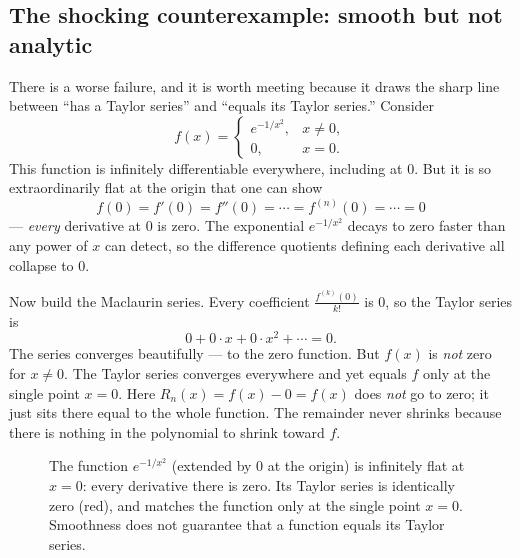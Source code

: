 \subsection{The shocking counterexample: smooth but not analytic}

There is a worse failure, and it is worth meeting because it draws the sharp line
between ``has a Taylor series'' and ``equals its Taylor series.'' Consider
\[
  f(x) =
  \begin{cases}
    e^{-1/x^2}, & x \ne 0, \\
    0, & x = 0.
  \end{cases}
\]
This function is infinitely differentiable everywhere, including at $0$. But it is so
extraordinarily flat at the origin that one can show
\[
  f(0) = f'(0) = f''(0) = \cdots = f^{(n)}(0) = \cdots = 0
\]
--- \emph{every} derivative at $0$ is zero. The exponential $e^{-1/x^2}$ decays to
zero faster than any power of $x$ can detect, so the difference quotients defining
each derivative all collapse to $0$.

Now build the Maclaurin series. Every coefficient $\frac{f^{(k)}(0)}{k!}$ is $0$, so
the Taylor series is
\[
  0 + 0\cdot x + 0\cdot x^2 + \cdots = 0.
\]
The series converges beautifully --- to the zero function. But $f(x)$ is \emph{not}
zero for $x \ne 0$. The Taylor series converges everywhere and yet equals $f$ only at
the single point $x=0$. Here $R_n(x) = f(x) - 0 = f(x)$ does \emph{not} go to zero;
it just sits there equal to the whole function. The remainder never shrinks because
there is nothing in the polynomial to shrink toward $f$.

\begin{figure}[H]
\centering
{}
\caption{The function $e^{-1/x^2}$ (extended by $0$ at the origin) is infinitely
flat at $x=0$: every derivative there is zero. Its Taylor series is identically zero
(red), and matches the function only at the single point $x=0$. Smoothness does not
guarantee that a function equals its Taylor series.}
\label{ch31:fig-flat}
\end{figure}

